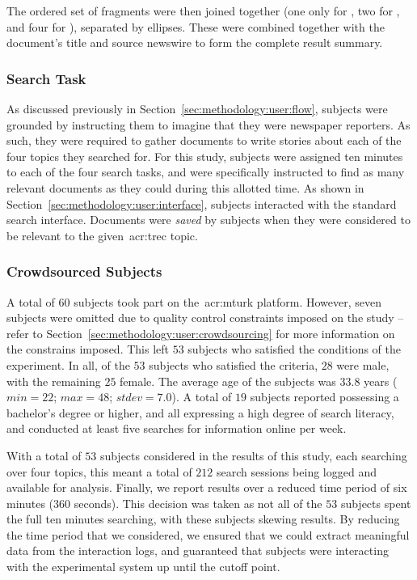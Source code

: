 The ordered set of fragments were then joined together (one only for , two for , and four for ), separated by ellipses. These were combined together with the document's title and source newswire to form the complete result summary.

\subsubsection{Search Task}
As discussed previously in Section~\ref{sec:methodology:user:flow}, subjects were grounded by instructing them to imagine that they were newspaper reporters. As such, they were required to gather documents to write stories about each of the four topics they searched for. For this study, subjects were assigned ten minutes to each of the four search tasks, and were specifically instructed to find as many relevant documents as they could during this allotted time. As shown in Section~\ref{sec:methodology:user:interface}, subjects interacted with the standard search interface. Documents were \emph{saved} by subjects when they were considered to be relevant to the given~\gls{acr:trec} topic.

\subsubsection{Crowdsourced Subjects}\label{sec:snippets:method:subjects}
A total of $60$ subjects took part on the~\gls{acr:mturk} platform. However, seven subjects were omitted due to quality control constraints imposed on the study -- refer to Section~\ref{sec:methodology:user:crowdsourcing} for more information on the constrains imposed. This left $53$ subjects who satisfied the conditions of the experiment. In all, of the $53$ subjects who satisfied the criteria, $28$ were male, with the remaining $25$ female. The average age of the subjects was $33.8$ years ($min=22$; $max=48$; $stdev=7.0$). A total of $19$ subjects reported possessing a bachelor's degree or higher, and all expressing a high degree of search literacy, and conducted at least five searches for information online per week.

With a total of $53$ subjects considered in the results of this study, each searching over four topics, this meant a total of $212$ search sessions being logged and available for analysis. Finally, we report results over a reduced time period of six minutes ($360$ seconds). This decision was taken as not all of the $53$ subjects spent the full ten minutes searching, with these subjects skewing results. By reducing the time period that we considered, we ensured that we could extract meaningful data from the interaction logs, and guaranteed that subjects were interacting with the experimental system up until the cutoff point.

